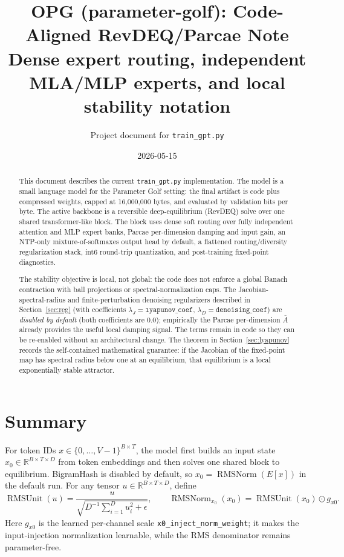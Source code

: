 \documentclass[11pt]{article}
\title{OPG (parameter-golf): Code-Aligned RevDEQ/Parcae Note\\
\large Dense expert routing, independent MLA/MLP experts, and local stability notation}
\author{Project document for \texttt{train\_gpt.py}}
\date{2026-05-15}
\newcommand{\R}{\mathbb{R}}
\newcommand{\RMSUnit}{\operatorname{RMSUnit}}
\newcommand{\RMSNorm}{\operatorname{RMSNorm}}
\begin{document}
\maketitle

\begin{abstract}
This document describes the current \texttt{train\_gpt.py} implementation.
The model is a small language model for the Parameter Golf setting: the final
artifact is code plus compressed weights, capped at 16,000,000 bytes, and
evaluated by validation bits per byte.  The active backbone is a reversible
deep-equilibrium (RevDEQ) solve over one shared transformer-like block.  The
block uses dense soft routing over fully independent attention and MLP expert
banks, Parcae per-dimension damping and input gain, an NTP-only
mixture-of-softmaxes output head by default, a flattened routing/diversity
regularization stack, int6 round-trip quantization, and post-training
fixed-point diagnostics.

The stability objective is local, not global: the code does not enforce a
global Banach contraction with ball projections or spectral-normalization caps.
The Jacobian-spectral-radius and finite-perturbation denoising regularizers
described in Section~\ref{sec:reg} (with coefficients
$\lambda_J=\texttt{lyapunov\_coef}$, $\lambda_D=\texttt{denoising\_coef}$) are
\emph{disabled by default} (both coefficients are $0.0$); empirically the
Parcae per-dimension $\bar A$ already provides the useful local damping signal.
The terms remain in code so they can be re-enabled without an architectural
change.  The theorem in Section~\ref{sec:lyapunov} records the self-contained
mathematical guarantee: if the Jacobian of the fixed-point map has spectral
radius below one at an equilibrium, that equilibrium is a local exponentially
stable attractor.
\end{abstract}

\tableofcontents

\section{Summary}
\label{sec:summary}

For token IDs $x\in\{0,\ldots,V-1\}^{B\times T}$, the model first builds an
input state $x_0\in\R^{B\times T\times D}$ from token embeddings and then
solves one shared block to equilibrium.  BigramHash is disabled by default, so
$x_0=\RMSNorm(E[x])$ in the default run.  For any tensor
$u\in\R^{B\times T\times D}$, define
\[
  \RMSUnit(u)
    = \frac{u}{\sqrt{D^{-1}\sum_{i=1}^D u_i^2+\epsilon}},
  \qquad
  \RMSNorm_{x_0}(x_0)=\RMSUnit(x_0)\odot g_{x0}.
\]
Here $g_{x0}$ is the learned per-channel scale
\texttt{x0\_inject\_norm\_weight}; it makes the input-injection normalization
learnable, while the RMS denominator remains parameter-free.
\end{document}
